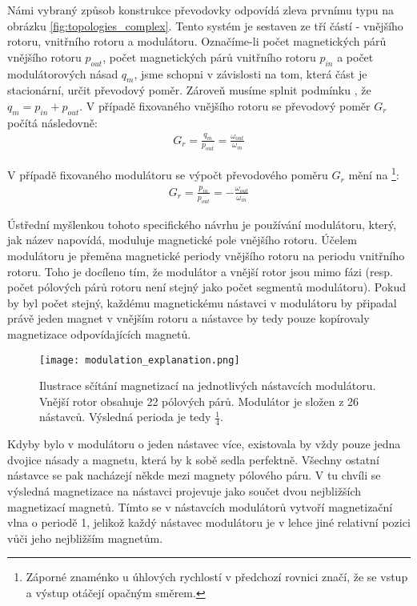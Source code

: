 {
    \raggedright
    Námi vybraný způsob konstrukce převodovky odpovídá zleva prvnímu typu na obrázku \ref{fig:topologies_complex}. Tento systém je sestaven ze tří částí - vnějšího rotoru, vnitřního rotoru a modulátoru. Označíme-li počet magnetických párů vnějšího rotoru $p_{out}$, počet magnetických párů vnitřního rotoru $p_{in}$ a počet modulátorových násad $q_m$, jsme schopni v závislosti na tom, která část je stacionární, určit převodový poměr. Zároveň musíme splnit podmínku \cite{MG_topologies}, že $q_m = p_{in} + p_{out}$.
    V případě fixovaného vnějšího rotoru se převodový poměr $G_r$ počítá následovně\cite{MG_topologies}:
    \begin{equation}
        \label{eq:gear_ratio1}
        \begin{gathered}
            G_r = \frac{q_m}{p_{out}} = \frac{\omega_{out}}{\omega_{m}}
        \end{gathered}
    \end{equation}

    V případě fixovaného modulátoru se výpočt převodového poměru $G_r$ mění na \cite{MG_topologies}\footnote{Záporné znaménko u úhlových rychlostí v předchozí rovnici značí, že se vstup a výstup otáčejí opačným směrem.}:
    \begin{equation}
        \label{eq:gear_ratio1}
        \begin{gathered}
            G_r = \frac{p_{in}}{p_{out}} = -\frac{\omega_{out}}{\omega_{in}}
        \end{gathered}
    \end{equation}
}

Ústřední myšlenkou tohoto specifického návrhu je používání modulátoru, který, jak název napovídá, moduluje magnetické pole vnějšího rotoru. Účelem modulátoru je přeměna magnetické periody vnějšího rotoru na periodu vnitřního rotoru. Toho je docíleno tím, že modulátor a vnější rotor jsou mimo fázi (resp. počet pólových párů rotoru není stejný jako počet segmentů modulátoru). Pokud by byl počet stejný, každému magnetickému nástavci v modulátoru by připadal právě jeden magnet v vnějším rotoru a nástavce by tedy pouze kopírovaly magnetizace odpovídajících magnetů.

\begin{wrapfigure}{r}{0.50\textwidth}
    \texttt{[image: modulation\_explanation.png]}
    \centering
    \caption[Ilustrace sčítání magnetizací na jednotlivých nástavcích modulátoru]{Ilustrace sčítání magnetizací na jednotlivých nástavcích modulátoru. Vnější rotor obsahuje 22 pólových párů. Modulátor je složen z 26 nástavců. Výsledná perioda je tedy $\frac{1}{4}.$}
    \label{fig:topologies_simple}
\end{wrapfigure}
Kdyby bylo v modulátoru o jeden nástavec více, existovala by vždy pouze jedna dvojice násady a magnetu, která by k sobě sedla perfektně. Všechny ostatní nástavce se pak nacházejí někde mezi magnety pólového páru. V tu chvíli se výsledná magnetizace na nástavci projevuje jako součet dvou nejbližších magnetizací magnetů. Tímto se v nástavcích modulátorů vytvoří magnetizační vlna o periodě 1, jelikož každý nástavec modulátoru je v lehce jiné relativní pozici vůči jeho nejbližším magnetům.

